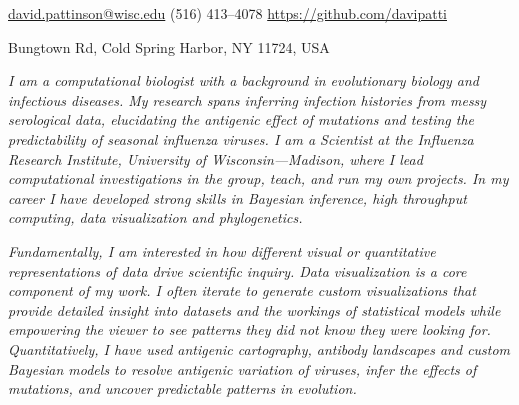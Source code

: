 \documentclass[10pt,a4paper]{article}
\begin{document}
\sloppy  %


\nobreakvspace{0.3em}  %

\noindent\href{mailto:david.pattinson@wisc.edu}{david.pattinson\mbox{}@\mbox{}wisc.edu}\sbull
{} (516) 413--4078\sbull
\href{https://github.com/davipatti}{https://github.com/davipatti}
\par {} Bungtown Rd, Cold Spring Harbor, NY 11724, USA

\spacedhrule{0.5em}{-0.4em}  %

 \begin{multicols}{2}

  \emph{ I am a computational biologist with a background in evolutionary biology and
  infectious diseases. My research spans inferring infection histories from messy
  serological data, elucidating the antigenic effect of mutations and testing the
  predictability of seasonal influenza viruses. I am a Scientist at the Influenza
  Research Institute, University of Wisconsin---Madison, where I lead computational
  investigations in the group, teach, and run my own projects. In my career I have
  developed strong skills in Bayesian inference, high throughput computing, data
  visualization and phylogenetics. }

  \emph{ Fundamentally, I am interested in how different visual or quantitative
  representations of data drive scientific inquiry. Data
  visualization is a core component of my work. I often iterate to generate custom
  visualizations that provide detailed insight into datasets and the workings of
  statistical models while empowering the viewer to see patterns they did not know they
  were looking for. Quantitatively, I have used antigenic cartography,
  antibody landscapes and custom Bayesian models to resolve antigenic variation
  of viruses, infer the effects of mutations, and uncover predictable patterns
  in evolution. }
\end{multicols}

\spacedhrule{0.9em}{-0.4em}
\end{document}
